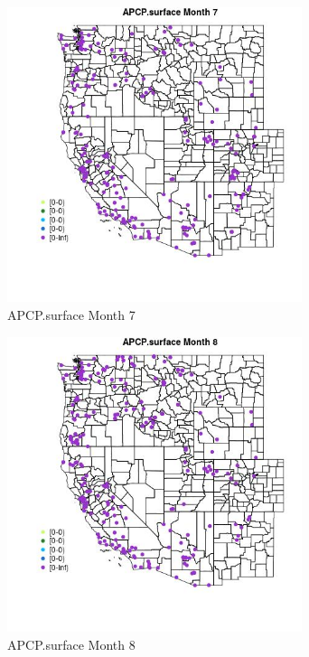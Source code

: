 \begin{figure} 
\centering  
\includegraphics[width=0.77\textwidth]{Code_Outputs/Report_ML_input_PM25_Step4_part_e_de_duplicated_aveswNAs_MapObsMo7APCPsurface.jpg} 
\caption{\label{fig:Report_ML_input_PM25_Step4_part_e_de_duplicated_aveswNAsMapObsMo7APCPsurface}APCP.surface Month 7} 
\end{figure} 
 

\begin{figure} 
\centering  
\includegraphics[width=0.77\textwidth]{Code_Outputs/Report_ML_input_PM25_Step4_part_e_de_duplicated_aveswNAs_MapObsMo8APCPsurface.jpg} 
\caption{\label{fig:Report_ML_input_PM25_Step4_part_e_de_duplicated_aveswNAsMapObsMo8APCPsurface}APCP.surface Month 8} 
\end{figure} 
 

